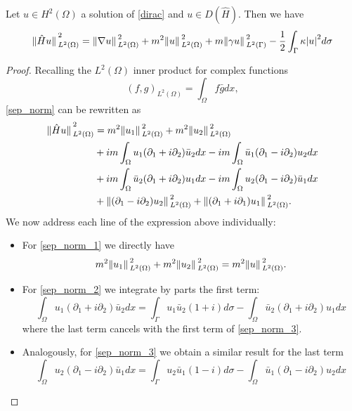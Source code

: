 \begin{lemma}\label{lemma_sep_norm}
    Let \(u \in H^2(\Omega)\) a solution of \eqref{dirac} and \(u \in D(\hat{H})\). Then we have
    \begin{equation}\label{sep_norm}
        \norm*{\hat{H}u}_{L^2(\Omega)}^2 = \norm*{\nabla u }_{L^2(\Omega)}^2 + m^2 \norm*{u}_{L^2(\Omega)}^2 + m \norm*{\gamma u}_{L^2(\Gamma)}^2 -\frac{1}{2}\int_{\Gamma}\kappa \abs{u}^2 d\sigma
    \end{equation}
\end{lemma}
\begin{proof}
    Recalling the \(L^2(\Omega)\) inner product for complex functions
    \[
    (f, g)_{L^2(\Omega)} = \int_\Omega f \bar{g} dx,
    \]
    \eqref{sep_norm} can be rewritten as 
    \begin{align}
        \norm*{\hat{H}u}_{L^2(\Omega)}^2 &= m^2 \norm*{u_1}_{L^2(\Omega)}^2 + m^2 \norm*{u_2}_{L^2(\Omega)}^2 \label{sep_norm_1}\\ 
        & + i m \int_\Omega u_1(\partial_1 + i \partial_2)\bar{u}_2dx - i m \int_\Omega \bar{u}_1(\partial_1 - i \partial_2)u_2 dx \label{sep_norm_2}\\ 
        & + i m \int_\Omega \bar{u}_2(\partial_1 + i \partial_2)u_1 dx - i m \int_\Omega u_2(\partial_1 - i \partial_2)\bar{u}_1 dx \label{sep_norm_3}\\ 
        & +\norm*{(\partial_1 - i \partial_2)u_2}_{L^2(\Omega)}^2 + \norm*{(\partial_1 + i \partial_1)u_1}_{L^2(\Omega)}^2. \label{sep_norm_4}
    \end{align}
    We now address each line of the expression above individually:
    \begin{itemize}
        \item For \eqref{sep_norm_1} we directly have
                \[
                    m^2 \norm*{u_1}_{L^2(\Omega)}^2 + m^2 \norm*{u_2}_{L^2(\Omega)}^2 = m^2 \norm*{u}_{L^2(\Omega)}^2.
                \]
        \item For \eqref{sep_norm_2} we integrate by parts the first term:
                \[
                \int_\Omega u_1(\partial_1 + i \partial_2)\bar{u}_2dx = \int_{\Gamma} u_1\bar{u}_2(1+i)d\sigma - \int_\Omega \bar{u}_2(\partial_1 + i \partial_2)u_1dx
                \]
            where the last term cancels with the first term of \eqref{sep_norm_3}.
        \item Analogously, for \eqref{sep_norm_3} we obtain a similar result for the last term
                \[
                \int_\Omega u_2(\partial_1 - i \partial_2)\bar{u}_1dx = \int_{\Gamma} u_2\bar{u}_1(1-i)d\sigma - \int_\Omega \bar{u}_1(\partial_1 - i \partial_2)u_2dx 
\]
\end{itemize}
\end{proof}
